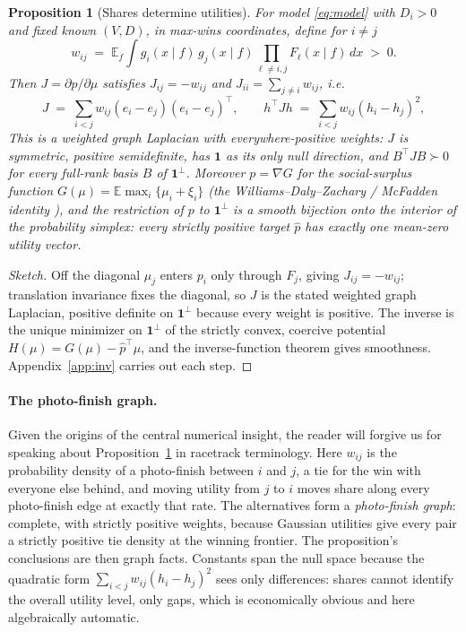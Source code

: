 \documentclass[12pt]{article}
\newtheorem{proposition}{Proposition}
\theoremstyle{remark}
\newcommand{\E}{\mathbb{E}}
\begin{document}
\begin{proposition}[Shares determine utilities]\label{thm:inv}
For model \eqref{eq:model} with $D_i > 0$ and fixed known $(V, D)$, in
max-wins coordinates, define
for $i \ne j$
\[
w_{ij} \;=\; \E_f \int g_i(x \mid f)\, g_j(x \mid f)
\prod_{\ell \ne i,j} F_\ell(x \mid f)\, dx \;>\; 0 .
\]
Then $J = \partial p / \partial \mu$ satisfies $J_{ij} = -w_{ij}$ and
$J_{ii} = \sum_{j \ne i} w_{ij}$, i.e.
\[
J \;=\; \sum_{i<j} w_{ij} (e_i - e_j)(e_i - e_j)^\top,
\qquad
h^\top J h \;=\; \sum_{i<j} w_{ij} (h_i - h_j)^2 ,
\]
This is a weighted graph Laplacian with everywhere-positive weights: $J$ is symmetric,
positive semidefinite, has $\mathbf{1}$ as its only null direction, and
$B^\top J B \succ 0$ for every full-rank basis $B$ of $\mathbf{1}^\perp$.
Moreover $p = \nabla G$ for the social-surplus function
$G(\mu) = \E \max_i \{\mu_i + \xi_i\}$ (the Williams--Daly--Zachary /
McFadden identity \citep{williams1977,daly1978,mcfadden1981}), and the restriction of $p$ to
$\mathbf{1}^\perp$ is a smooth bijection onto the interior of the
probability simplex: every strictly positive target $\hat p$ has exactly one
mean-zero utility vector.
\end{proposition}
\begin{proof}[Sketch]
Off the diagonal $\mu_j$ enters $p_i$ only through $F_j$, giving
$J_{ij} = -w_{ij}$; translation invariance fixes the diagonal, so $J$ is
the stated weighted graph Laplacian, positive definite on
$\mathbf{1}^\perp$ because every weight is positive. The inverse is the
unique minimizer on $\mathbf{1}^\perp$ of the strictly convex, coercive
potential $H(\mu) = G(\mu) - \hat p^\top \mu$, and the inverse-function
theorem gives smoothness. Appendix~\ref{app:inv} carries out each step.
\end{proof}
\paragraph{The photo-finish graph.} Given the origins of the central numerical insight, the reader will forgive us for speaking about Proposition~\ref{thm:inv} in racetrack terminology. Here $w_{ij}$ is the probability density of a photo-finish between
$i$ and $j$, a tie for the win with everyone else behind, and moving
utility from $j$ to $i$ moves share along every photo-finish edge at
exactly that rate. The alternatives form a \emph{photo-finish graph}:
complete, with strictly positive weights, because Gaussian utilities give
every pair a strictly positive tie density at the winning frontier. The proposition's conclusions are then
graph facts. Constants span the null space because the quadratic form
$\sum_{i<j} w_{ij}(h_i - h_j)^2$ sees only differences: shares cannot
identify the overall utility level, only gaps, which is economically
obvious and here algebraically automatic.
\end{document}
